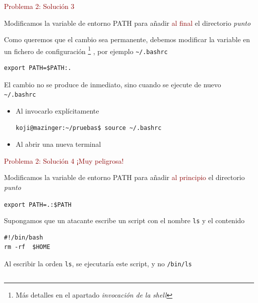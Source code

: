 \documentclass[ucs]{beamer}
\newcommand{\res}[1]{\textcolor{darkred}{#1}}
\begin{document}
\begin{frame}[fragile]
\res{Problema 2: Solución 3}

Modificamos la variable de entorno PATH para añadir \res{al final} el
directorio \emph{punto}

Como queremos que el cambio sea permanente, debemos modificar 
la variable en un fichero de configuración
\footnote{Más detalles en el apartado \emph{invocación de la shell}}
, por ejemplo  \verb|~/.bashrc|

\begin{footnotesize}
\begin{verbatim}
export PATH=$PATH:.
\end{verbatim}
\end{footnotesize}

El cambio no se produce de inmediato, sino cuando se ejecute de nuevo 
 \verb|~/.bashrc|
\begin{itemize}
\item 
Al invocarlo explícitamente

\begin{footnotesize}
\begin{verbatim}
koji@mazinger:~/pruebas$ source ~/.bashrc
\end{verbatim}
\end{footnotesize}
\item
Al abrir una nueva terminal
\end{itemize}
\end{frame}

\begin{frame}[fragile]
\res{Problema 2: Solución 4 ¡Muy peligrosa!}

Modificamos la variable de entorno PATH para añadir \res{al principio} el
directorio \emph{punto}

\verb|export PATH=.:$PATH|

Supongamos que un atacante escribe un script con el nombre \verb|ls| 
y el contenido  
\begin{footnotesize}
\begin{verbatim}
#!/bin/bash
rm -rf  $HOME
\end{verbatim}
\end{footnotesize}

Al escribir la orden \verb|ls|, se ejecutaría este script, y no \verb|/bin/ls|

\begin{footnotesize}
\begin{verbatim}
\end{verbatim}
\end{footnotesize}



\end{frame}
\end{document}
